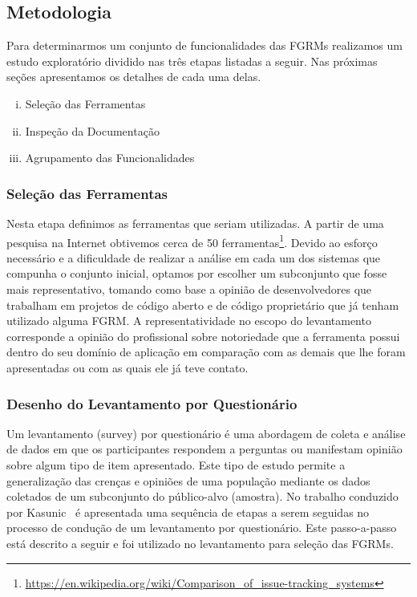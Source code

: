 \subsection{Metodologia}\label{subsec:metodologia}

Para determinarmos um conjunto de funcionalidades das FGRMs realizamos um
estudo exploratório dividido nas três etapas listadas a seguir. Nas próximas
seções apresentamos os detalhes de cada uma delas.

\begin{enumerate}[(i)]
	\item Seleção das Ferramentas
	\item Inspeção da Documentação
	\item Agrupamento das Funcionalidades
\end{enumerate}

\subsubsection{Seleção das Ferramentas}\label{subsubsec:selecao-ferramentas}

Nesta etapa definimos as ferramentas que seriam utilizadas. A partir de uma
pesquisa na Internet obtivemos cerca de 50
ferramentas\footnote{\url{https://en.wikipedia.org/wiki/Comparison_of_issue-tracking_systems}}.
Devido ao esforço necessário e a dificuldade de realizar a análise em cada um
dos sistemas que compunha o conjunto inicial, optamos por escolher um
subconjunto que fosse mais representativo, tomando como base a opinião de
desenvolvedores que trabalham em projetos de código aberto e de código
proprietário que já tenham utilizado alguma FGRM\@. A representatividade no
escopo do levantamento corresponde a opinião do profissional sobre notoriedade
que a ferramenta possui dentro do seu domínio de aplicação em comparação com as
demais que lhe foram apresentadas ou com as quais ele já teve contato.

\subsubsection{Desenho do Levantamento por Questionário}\label{ssub:metodologia_desenho_da_pesquisa_com_profissionais}

Um levantamento (survey) por questionário é uma abordagem de coleta e análise
de dados em que os participantes respondem a perguntas ou manifestam opinião
sobre algum tipo de item apresentado. Este tipo de estudo permite a
generalização das crenças e opiniões de uma população mediante os dados
coletados de um subconjunto do público-alvo (amostra). No trabalho conduzido
por Kasunic~\cite{kasunic2005designing} é apresentada uma sequência de etapas a
serem seguidas no processo de condução de um levantamento por questionário.
Este passo-a-passo está descrito a seguir e foi utilizado no levantamento para
seleção das FGRMs.

